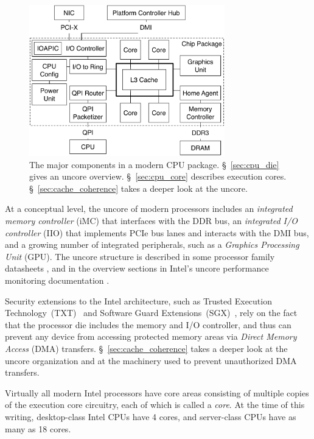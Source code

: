 \begin{figure}[hbt]
  \centering
  \includegraphics[width=85mm]{figures/cpu_die.pdf}
  \caption{
    The major components in a modern CPU package. \S~\ref{sec:cpu_die} gives
    an uncore overview. \S~\ref{sec:cpu_core} describes execution cores.
    \S~\ref{sec:cache_coherence} takes a deeper look at the uncore.
  }
  \label{fig:cpu_die}
\end{figure}


At a conceptual level, the uncore of modern processors includes an
\textit{integrated memory controller} (iMC) that interfaces with the DDR bus,
an \textit{integrated I/O controller} (IIO) that implements PCIe bus lanes and
interacts with the DMI bus, and a growing number of integrated peripherals,
such as a \textit{Graphics Processing Unit} (GPU). The uncore structure is
described in some processor family datasheets \cite{intel2014datasheet,
intel2010datasheet}, and in the overview sections in Intel's uncore performance
monitoring documentation \cite{intel2014uncore, intel2012uncore,
intel2010uncore}.

Security extensions to the Intel architecture, such as Trusted Execution
Technology~(TXT)~\cite{grawrock2009txt} and Software Guard
Extensions~(SGX)~\cite{mckeen2013sgx, anati2013sgx}, rely on the fact that the
processor die includes the memory and I/O controller, and thus can prevent any
device from accessing protected memory areas via \textit{Direct Memory Access}
(DMA) transfers. \S~\ref{sec:cache_coherence} takes a deeper look at the uncore
organization and at the machinery used to prevent unauthorized DMA transfers.


\label{sec:cpu_core}

Virtually all modern Intel processors have core areas consisting of multiple
copies of the execution core circuitry, each of which is called a
\textit{core}.  At the time of this writing, desktop-class Intel CPUs have 4
cores, and server-class CPUs have as many as 18 cores.

